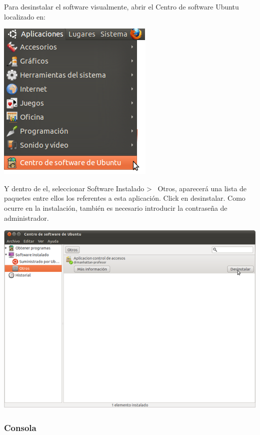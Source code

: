 \documentclass[11pt]{article}
\begin{document}
Para desinstalar el software visualmente, abrir el Centro de software Ubuntu localizado en:

\begin{center}

    \includegraphics{imagenes/localLizacionCentroSoftware}

\end{center}

Y dentro de el, seleccionar Software Instalado > \ Otros, aparecerá una lista de paquetes entre ellos los referentes a esta aplicación. Click en desinstalar. Como ocurre en la instalación, también es necesario introducir la contraseña de administrador.

\begin{center}

    \includegraphics[width=.90\linewidth]{imagenes/desinstalar}

\end{center}

\subsubsection{Consola}
\end{document}
